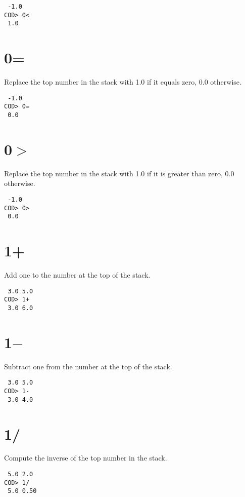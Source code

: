 \medskip
{}
\begin{verbatim}
 -1.0
COD> 0<
 1.0
\end{verbatim}

\section*{0=}
Replace the top number in the stack with 1.0 if it equals zero,
0.0 otherwise.

\medskip
{}
\begin{verbatim}
 -1.0
COD> 0=
 0.0
\end{verbatim}

\section*{0$>$}
Replace the top number in the stack with 1.0 if it is greater than zero,
0.0 otherwise.

\medskip
{}
\begin{verbatim}
 -1.0
COD> 0>
 0.0
\end{verbatim}

\section*{1+}
Add one to the number at the top of the stack.

\medskip
{}
\begin{verbatim}
 3.0 5.0
COD> 1+
 3.0 6.0
\end{verbatim}

\section*{1$-$}
Subtract one from the number at the top of the stack.

\medskip
{}
\begin{verbatim}
 3.0 5.0
COD> 1-
 3.0 4.0
\end{verbatim}

\section*{1/}
Compute the inverse of the top number in the stack.

\medskip
{}
\begin{verbatim}
 5.0 2.0
COD> 1/
 5.0 0.50
\end{verbatim}

